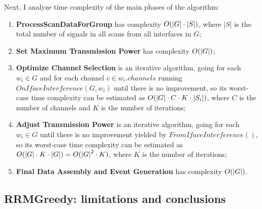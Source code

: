 Next, I analyze time complexity of the main phases of the algorithm:

\begin{enumerate}
    \item \textbf{ProcessScanDataForGroup} has complexity $O(\lvert{G}\rvert \cdot \lvert S \rvert)$, where $\lvert S \rvert$ is the total number of signals in all scans from all interfaces in $G$;
    \item \textbf{Set Maximum Transmission Power} has complexity $O(\lvert{G}\rvert)$;
    \item \textbf{Optimize Channel Selection} is an iterative algorithm, going for each $w_i \in G$ and for each channel $c \in w_i.channels$ running $OnIfaceInterference(G, w_i)$ until there is no improvement, so its worst-case time complexity can be estimated as $O(\lvert{G}\rvert \cdot C \cdot K \cdot \lvert{S_i}\rvert)$, where $C$ is the number of channels and $K$ is the number of iterations;
    \item \textbf{Adjust Transmission Power} is an iterative algorithm, going for each $w_i \in G$ until there is no improvement yielded by $FromIfaceInterference()$, so its worst-case time complexity can be estimated as $O(\lvert{G}\rvert \cdot K \cdot \lvert{G}\rvert) = O({\lvert{G}\rvert}^2 \cdot K)$, where $K$ is the number of iterations;
    \item \textbf{Final Data Assembly and Event Generation} has complexity $O(\lvert{G}\rvert)$.
\end{enumerate}

\subsection{RRMGreedy: limitations and conclusions}
\label{sec:flaws}

